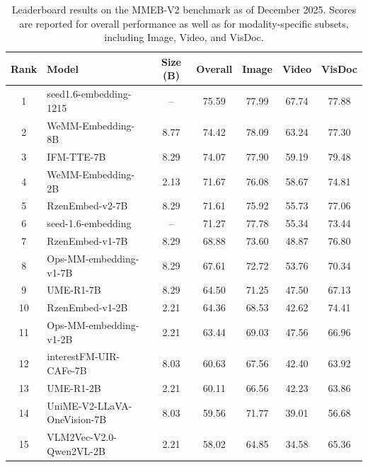 \begin{table}[t]
\centering
\small
\setlength{\tabcolsep}{6pt}
\begin{tabular}{c l c c c c c}
\toprule
\textbf{Rank} & \textbf{Model} & \textbf{Size (B)} & \textbf{Overall} & \textbf{Image} & \textbf{Video} & \textbf{VisDoc} \\
\midrule
1  & seed1.6-embedding-1215        & --    & 75.59 & 77.99 & 67.74 & 77.88 \\
2  & WeMM-Embedding-8B             & 8.77  & 74.42 & 78.09 & 63.24 & 77.30 \\
3  & IFM-TTE-7B                    & 8.29  & 74.07 & 77.90 & 59.19 & 79.48 \\
4  & WeMM-Embedding-2B             & 2.13  & 71.67 & 76.08 & 58.67 & 74.81 \\
5  & RzenEmbed-v2-7B               & 8.29  & 71.61 & 75.92 & 55.73 & 77.06 \\
6  & seed-1.6-embedding             & --    & 71.27 & 77.78 & 55.34 & 73.44 \\
7  & RzenEmbed-v1-7B               & 8.29  & 68.88 & 73.60 & 48.87 & 76.80 \\
8  & Ops-MM-embedding-v1-7B        & 8.29  & 67.61 & 72.72 & 53.76 & 70.34 \\
9  & UME-R1-7B                     & 8.29  & 64.50 & 71.25 & 47.50 & 67.13 \\
10 & RzenEmbed-v1-2B               & 2.21  & 64.36 & 68.53 & 42.62 & 74.41 \\
11 & Ops-MM-embedding-v1-2B        & 2.21  & 63.44 & 69.03 & 47.56 & 66.96 \\
12 & interestFM-UIR-CAFe-7B        & 8.03  & 60.63 & 67.56 & 42.40 & 63.92 \\
13 & UME-R1-2B                     & 2.21  & 60.11 & 66.56 & 42.23 & 63.86 \\
14 & UniME-V2-LLaVA-OneVision-7B   & 8.03  & 59.56 & 71.77 & 39.01 & 56.68 \\
15 & VLM2Vec-V2.0-Qwen2VL-2B       & 2.21  & 58.02 & 64.85 & 34.58 & 65.36 \\
\bottomrule
\end{tabular}
\caption{Leaderboard results on the MMEB-V2 benchmark as of December 2025. Scores are reported for overall performance as well as for modality-specific subsets, including Image, Video, and VisDoc.
}
\label{tab:mmeb_v2_leaderboard}
\end{table}
